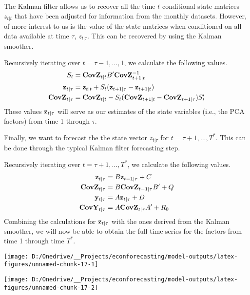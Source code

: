 \documentclass[11pt, letterpaper]{article}\usepackage[]{graphicx}\usepackage[]{color}
\newcommand{\vv}[1]{\textcolor{black}{\mathbf{#1}}}
\begin{document}
The Kalman filter allows us to recover all the time $t$ conditional state matrices $z_{t|t}$ that have been adjusted for information from the monthly datasets. However, of more interest to us is the value of the state matrices when conditioned on all data available at time $\tau$, $z_{t|\tau}$. This can be recovered by using the Kalman smoother.

Recursively iterating over $t = \tau - 1, \dots, 1$, we calculate the following values. 
\begin{align*}
	S_{t} &= \vv{CovZ}_{t|t} B' \vv{CovZ}^{-1}_{t + 1|t}\\
	\vv{z}_{t|\tau} &= \vv{z}_{t|t} + S_t (\vv{z}_{t+1|\tau} - \vv{z}_{t + 1|t})\\
	\vv{CovZ}_{t|\tau} &= \vv{CovZ}_{t|t} - S_t(\vv{CovZ}_{t + 1|t} - \vv{CovZ}_{t + 1|\tau})S'_t
\end{align*}
These values $\vv{z}_{t|\tau}$ will serve as our estimates of the state variables (i.e., the PCA factors) from time 1 through $\tau$.

Finally, we want to forecast the the state vector $z_{t|\tau}$ for $t = \tau + 1, \dots, T^*$. This can be done through the typical Kalman filter forecasting step.

Recursively iterating over $t = \tau + 1, \dots, T^*$, we calculate the following values.
\begin{align*}
	\vv{z}_{t|\tau} &= B \vv{z}_{t-1|\tau} + C\\
	\vv{CovZ}_{t|\tau} &= B \vv{CovZ}_{t-1|\tau} B'+ Q\\
	\vv{y}_{t|\tau} &= A \vv{z}_{t|\tau} + D\\
	\vv{CovY}_{t|\tau} &= A \vv{CovZ}_{t|\tau} A' + R_0
\end{align*}
Combining the calculations for $\vv{z}_{t|\tau}$ with the ones derived from the Kalman smoother, we will now be able to obtain the full time series for the factors from time 1 through time $T^*$.



{\centering \texttt{[image: D:/Onedrive/\_\_Projects/econforecasting/model-outputs/latex-figures/unnamed-chunk-17-1]} 

}




{\centering \texttt{[image: D:/Onedrive/\_\_Projects/econforecasting/model-outputs/latex-figures/unnamed-chunk-17-2]} 

}
\end{document}
